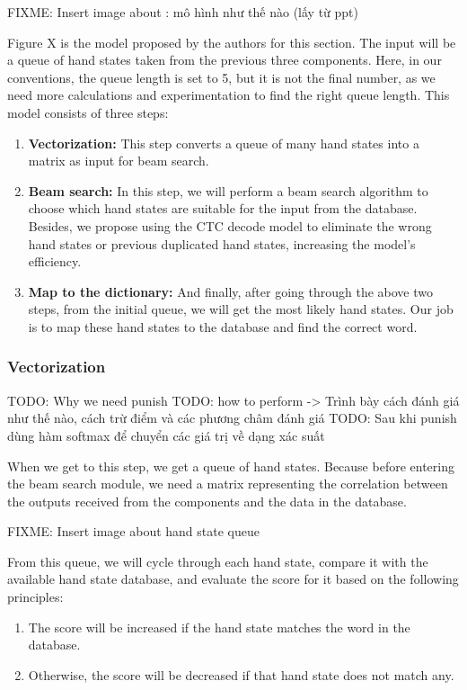 FIXME: Insert image about : mô hình như thế nào (lấy từ ppt)

Figure X is the model proposed by the authors for this section. The input will be a queue of hand states taken from the previous three components. Here, in our conventions, the queue length is set to 5, but it is not the final number, as we need more calculations and experimentation to find the right queue length. This model consists of three steps:

\begin{enumerate}
  \item \textbf{Vectorization:} This step converts a queue of many hand states into a matrix as input for beam search.
  \item \textbf{Beam search:} In this step, we will perform a beam search algorithm to choose which hand states are suitable for the input from the database. Besides, we propose using the CTC decode model to eliminate the wrong hand states or previous duplicated hand states, increasing the model's efficiency.
  \item \textbf{Map to the dictionary:} And finally, after going through the above two steps, from the initial queue, we will get the most likely hand states. Our job is to map these hand states to the database and find the correct word.
\end{enumerate}
      
\subsubsection{ Vectorization }
TODO: Why we need punish
TODO: how to perform -> Trình bày cách đánh giá như thế nào, cách trừ điểm và các phương châm đánh giá
TODO: Sau khi punish dùng hàm softmax để chuyển các giá trị về dạng xác suất

When we get to this step, we get a queue of hand states. Because before entering the beam search module, we need a matrix representing the correlation between the outputs received from the components and the data in the database.

FIXME: Insert image about hand state queue

From this queue, we will cycle through each hand state, compare it with the available hand state database, and evaluate the score for it based on the following principles:

\begin{enumerate}
  \item The score will be increased if the hand state matches the word in the database.
  \item Otherwise, the score will be decreased if that hand state does not match any.
\end{enumerate}

